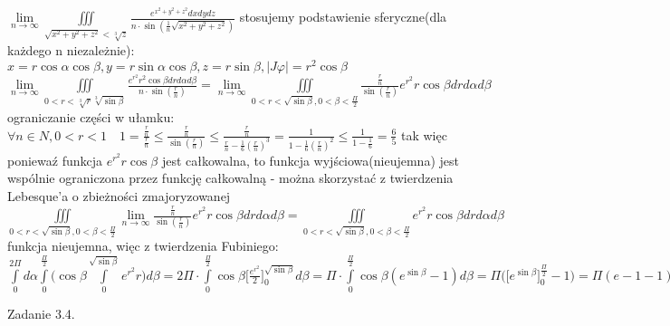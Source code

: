 \documentclass{article}
\begin{document}
$
\lim\limits_{n \to \infty}\iiint\limits_{\sqrt{x^2+y^2+z^2}<\sqrt[3]{z}}\frac{e^{x^2+y^2+z^2}dxdydz}{n\cdot\sin{(\frac{1}{n}\sqrt{x^2+y^2+z^2})}}
$\newline
stosujemy podstawienie sferyczne(dla każdego n niezależnie): $x=r\cos{\alpha}\cos{\beta},y=r\sin{\alpha}\cos{\beta},z=r\sin{\beta},|J\varphi|=r^2\cos{\beta}$
\newline
$
\lim\limits_{n \to \infty}\iiint\limits_{0<r<\sqrt[3]{r}\sqrt[3]{\sin{\beta}}}\frac{e^{r^2}r^2\cos{\beta}drd\alpha d\beta}{n\cdot\sin{(\frac{r}{n})}}
=
\lim\limits_{n \to \infty}\iiint\limits_{0<r<\sqrt{\sin{\beta}},0<\beta<\frac{\Pi}{2}}\frac{\frac{r}{n}}{\sin{(\frac{r}{n})}}e^{r^2}r\cos{\beta}drd\alpha d\beta
$\newline
ograniczanie części w ułamku:
$
\forall n \in N,0<r<1\quad
1=\frac{\frac{r}{n}}{\frac{r}{n}}\le\frac{\frac{r}{n}}{\sin{(\frac{r}{n})}}\le\frac{\frac{r}{n}}{\frac{r}{n}-\frac{1}{6}(\frac{r}{n})^3}
=\frac{1}{1-\frac{1}{6}(\frac{r}{n})^2}\le\frac{1}{1-\frac{1}{6}}=\frac{6}{5}
$
tak więc poniewaź funkcja $e^{r^2}r\cos{\beta}$ jest całkowalna, to funkcja wyjściowa(nieujemna) jest wspólnie ograniczona przez funkcję całkowalną
- można skorzystać z twierdzenia Lebesque'a o zbieżności zmajoryzowanej\newline
$
\iiint\limits_{0<r<\sqrt{\sin{\beta}},0<\beta<\frac{\Pi}{2}}\lim\limits_{n \to \infty}\frac{\frac{r}{n}}{\sin{(\frac{r}{n})}}e^{r^2}r\cos{\beta}drd\alpha d\beta
=
\iiint\limits_{0<r<\sqrt{\sin{\beta}},0<\beta<\frac{\Pi}{2}}e^{r^2}r\cos{\beta}drd\alpha d\beta
$
funkcja nieujemna, więc z twierdzenia Fubiniego:
$
\int\limits_{0}^{2\Pi}d\alpha\int\limits_{0}^{\frac{\Pi}{2}}\bigl(\cos{\beta}\int\limits_{0}^{\sqrt{\sin{\beta}}}e^{r^2}r\bigr)d\beta
=
2\Pi\cdot\int\limits_{0}^{\frac{\Pi}{2}}\cos{\beta}\bigl[\frac{e^{r^2}}{2}\bigr]_{0}^{\sqrt{\sin{\beta}}}d\beta
=
\Pi\cdot\int\limits_{0}^{\frac{\Pi}{2}}\cos{\beta}(e^{\sin{\beta}}-1)d\beta
=
\Pi\bigl(\bigl[e^{\sin{\beta}}\bigr]_{0}^{\frac{\Pi}{2}}-1\bigl)
=
\Pi(e-1-1)=\Pi(e-2)
$
\newline
\newline




Zadanie 3.4.
\newline
\end{document}
